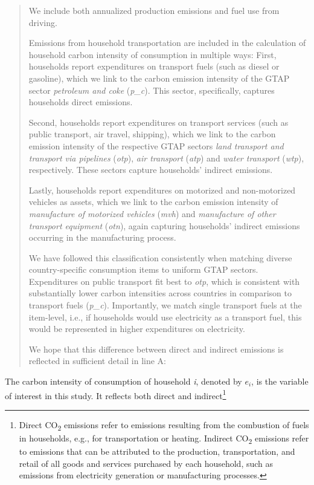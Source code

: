 \documentclass[11pt]{article}
\newenvironment{response}
{\begin{quote}\color{black}}
{\end{quote}}
\begin{document}
\begin{response}
    We include both annualized production emissions and fuel use from driving.

    Emissions from household transportation are included in the calculation of household carbon intensity of consumption in multiple ways: First, households report expenditures on transport fuels (such as diesel or gasoline), which we link to the carbon emission intensity of the GTAP sector \textit{petroleum and coke} (\textit{p\_c}). This sector, specifically, captures households direct emissions. 
    
    Second, households report expenditures on transport services (such as public transport, air travel, shipping), which we link to the carbon emission intensity of the respective GTAP sectors \textit{land transport and transport via pipelines} (\textit{otp}), \textit{air transport} (\textit{atp}) and \textit{water transport} (\textit{wtp}), respectively. These sectors capture households' indirect emissions. 
    
    Lastly, households report expenditures on motorized and non-motorized vehicles as assets, which we link to the carbon emission intensity of \textit{manufacture of motorized vehicles} (\textit{mvh}) and \textit{manufacture of other transport equipment} (\textit{otn}), again capturing households' indirect emissions occurring in the manufacturing process.

    We have followed this classification consistently when matching diverse country-specific consumption items to uniform GTAP sectors. Expenditures on public transport fit best to \textit{otp}, which is consistent with substantially lower carbon intensities across countries in comparison to transport fuels (\textit{p\_c}). Importantly, we match single transport fuels at the item-level, i.e., if households would use electricity as a transport fuel, this would be represented in higher expenditures on electricity.

    We hope that this difference between direct and indirect emissions is reflected in sufficient detail in line A:
    
\end{response}

\begin{revisionbox}
    The carbon intensity of consumption of household \textit{i}, denoted by $e_{i}$, is the variable of interest in this study. It reflects both direct and indirect\footnote{Direct CO\textsubscript{2} emissions refer to emissions resulting from the combustion of fuels in households, e.g., for transportation or heating. Indirect CO\textsubscript{2} emissions refer to emissions that can be attributed to the production, transportation, and retail of all goods and services purchased by each household, such as emissions from electricity generation or manufacturing processes.}
\end{revisionbox}
\end{document}
